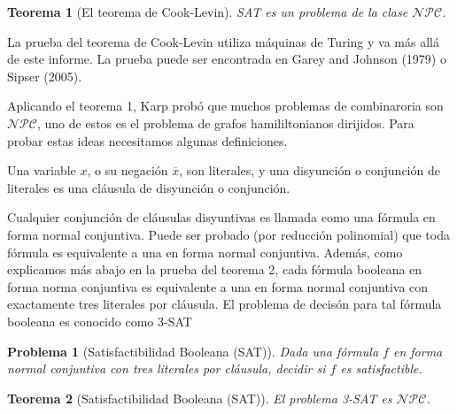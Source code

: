 \documentclass{article}
\newtheorem{theorem}{Teorema}
\newtheorem{problem}{Problema}
\begin{document}
\begin{theorem}[El teorema de Cook-Levin]
SAT es un problema de la clase $\mathcal{NPC}$.
\end{theorem}
La prueba del teorema de Cook-Levin utiliza máquinas de Turing
y va más allá de este informe. La prueba puede ser encontrada
en Garey and Johnson (1979) o Sipser (2005).

Aplicando el teorema 1, Karp probó que muchos problemas de
combinaroria son $\mathcal{NPC}$, uno de estos es el problema
de grafos hamililtonianos dirijidos. Para probar estas ideas
necesitamos algunas definiciones.

Una variable $x$, o su negación $\overline{x}$, son literales,
y una disyunción o conjunción de literales es una cláusula
de disyunción o conjunción.

Cualquier conjunción de cláusulas disyuntivas es llamada como
una fórmula en forma normal conjuntiva. Puede ser probado 
(por reducción polinomial) que toda fórmula es equivalente
a una en forma normal conjuntiva. Además, como explicamos más
abajo en la prueba del teorema 2, cada fórmula booleana en 
forma norma conjuntiva es equivalente a una en forma normal
conjuntiva con exactamente tres literales por cláusula. El
problema de decisón para tal fórmula booleana es conocido como
3-SAT

\begin{problem}[Satisfactibilidad Booleana (SAT)]
Dada una fórmula $f$ en forma normal conjuntiva con tres
literales por cláusula, decidir si $f$ es satisfactible.
\end{problem}

\begin{theorem}[Satisfactibilidad Booleana (SAT)]
El problema 3-SAT es $\mathcal{NPC}$.
\end{theorem}
\end{document}
